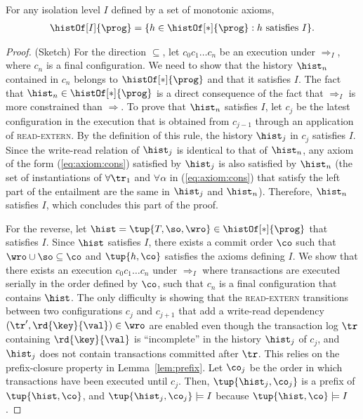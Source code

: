  \begin{theorem}
For any isolation level $I$ defined by a set of monotonic axioms,
\begin{align*}
\histOf[I]{\prog} = \{ h \in \histOf[*]{\prog}: h\mbox{ satisfies }I\}.
\end{align*}
 \end{theorem}
 \begin{proof}(Sketch)
For the direction $\subseteq$, let $c_0 c_1\ldots c_n$ be an execution under $\Rightarrow_I$, where $c_n$ is a final configuration. We need to show that the history $\hist_n$ contained in $c_n$ belongs to $\histOf[*]{\prog}$ and that it satisfies $I$. The fact that $\hist_n\in \histOf[*]{\prog}$ is a direct consequence of the fact that $\Rightarrow_I$ is more constrained than $\Rightarrow$. To prove that $\hist_n$ satisfies $I$, let $c_j$ be the latest configuration in the execution that is obtained from $c_{j-1}$ through an application of \textsc{read-extern}. By the definition of this rule, the history $\hist_j$ in $c_j$ satisfies $I$. Since the write-read relation of $\hist_j$ is identical to that of $\hist_n$, any axiom of the form (\ref{eq:axiom:cons}) satisfied by $\hist_j$ is also satisfied by $\hist_n$ (the set of instantiations of $\forall \tr_1$ and $\forall \alpha$ in (\ref{eq:axiom:cons}) that satisfy the left part of the entailment are the same in $\hist_j$ and $\hist_n$). Therefore, $\hist_n$ satisfies $I$, which concludes this part of the proof.

For the reverse, let $\hist=\tup{T, \so, \wro}\in \histOf[*]{\prog}$ that satisfies $I$. Since $\hist$ satisfies $I$, there exists a commit order $\co$ such that $\wro\cup\so\subseteq \co$ and $\tup{h,\co}$ satisfies the axioms defining $I$. We show that there exists an execution $c_0 c_1\ldots c_n$ under $\Rightarrow_I$ where transactions are executed serially in the order defined by $\co$, such that $c_n$ is a final configuration that contains $\hist$. The only difficulty is showing that the \textsc{read-extern} transitions between two configurations $c_j$ and $c_{j+1}$ that add a write-read dependency $(\tr',\rd{\key}{\val})\in\wro$ are enabled even though the transaction log $\tr$ containing $\rd{\key}{\val}$ is ``incomplete'' in the history $\hist_j$ of $c_j$, and $\hist_j$ does not contain transactions committed after $\tr$. This relies on the prefix-closure property in Lemma~\ref{lem:prefix}.
Let $\co_j$ be the order in which transactions have been executed until $c_j$. Then, $\tup{\hist_j,\co_j}$ is a prefix of $\tup{\hist,\co}$, and $\tup{\hist_j,\co_j}\models I$ because $\tup{\hist,\co}\models I$.
 \end{proof}

